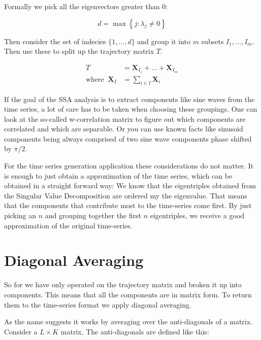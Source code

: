 Formally we pick all the eigenvectors greater than 0:

\begin{equation}
  d=\max \left\{j: \lambda_{j} \neq 0\right\} 
\end{equation}

Then consider the set of indecies $\{1, \ldots, d\}$ and group it into $m$ subsets $I_1, \ldots, I_m$. Then use these to split up the trajectory matrix $T$. 

\begin{equation}
   \begin{aligned}
      T&=\mathbf{X}_{I_{1}}+\ldots+\mathbf{X}_{I_{m}} \\
      \text{where} \;\; \mathbf{X}_{I}&=\sum_{i \in I} \mathbf{X}_{i}
   \end{aligned}
\end{equation}
  
If the goal of the SSA analysis is to extract components like sine waves from the time series, a lot of care has to be taken when choosing these groupings. One can look at the so-called w-correlation matrix to figure out which components are correlated and which are separable. Or you can use known facts like sinusoid components being always comprised of two sine wave components phase shifted by $\pi/2$. 

For the time series generation application these considerations do not matter. It is enough to just obtain a approximation of the time series, which can be obtained in a straight forward way: We know that the eigentriples obtained from the Singular Value Decomposition are ordered my the eigenvalue. That means that the components that contribute most to the time-series come first. By just picking an $n$ and grouping together the first $n$ eigentriples, we receive a good approximation of the original time-series. 

\section{Diagonal Averaging}

So for we have only operated on the trajectory matrix and broken it up into components. This means that all the components are in matrix form. To return them to the time-series format we apply diagonal averaging. 

As the name suggests it works by averaging over the anti-diagonals of a matrix. Consider a $L\times K$ matrix. The anti-diagonals are defined like this: 

